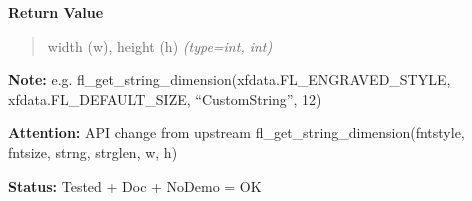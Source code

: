 \begin{boxedminipage}{\funcwidth}
      \textbf{Return Value}
    \vspace{-1ex}

      \begin{quote}

width (w), height (h)
      {\it (type=int, int)}

      \end{quote}

\textbf{Note:} 
e.g. fl\_get\_string\_dimension(xfdata.FL\_ENGRAVED\_STYLE,
xfdata.FL\_DEFAULT\_SIZE, ``CustomString'', 12)


\textbf{Attention:} 
API change from upstream
fl\_get\_string\_dimension(fntstyle, fntsize, strng, strglen, w, h)


\textbf{Status:} 
Tested + Doc + NoDemo = OK


    \end{boxedminipage}

    \label{xformslib:flbasic:fl_get_align_xy}

    \vspace{0.5ex}

